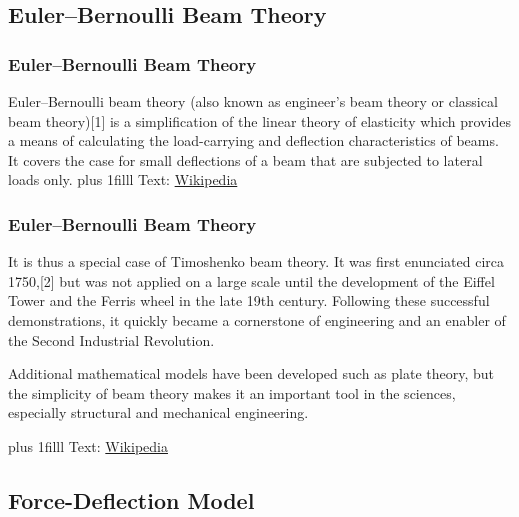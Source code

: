 \documentclass[fleqn]{beamer} %
\newcommand{\sectionIsubsectionItitle}{Euler–Bernoulli Beam Theory}
\newcommand{\sectionIsubsectionIItitle}{Force-Deflection Model}
\newcommand{\btVFill}{\vskip0pt plus 1filll}
\begin{document}
		\subsection{\sectionIsubsectionItitle}\label{sectionIsubsectionI}

			\begin{frame}
				\frametitle{\sectionIsubsectionItitle}
				\bigskip

				Euler–Bernoulli beam theory (also known as engineer's beam theory or classical beam theory)[1] is a simplification of the linear theory of elasticity which provides a means of calculating the load-carrying and deflection characteristics of beams. It covers the case for small deflections of a beam that are subjected to lateral loads only. 
				\btVFill
				{\tiny Text: \href{https://en.wikipedia.org/wiki/Euler\%E2\%80\%93Bernoulli_beam_theory}{Wikipedia}}

			\end{frame}

			\begin{frame}
				\frametitle{\sectionIsubsectionItitle}
				\bigskip

				It is thus a special case of Timoshenko beam theory. It was first enunciated circa 1750,[2] but was not applied on a large scale until the development of the Eiffel Tower and the Ferris wheel in the late 19th century. Following these successful demonstrations, it quickly became a cornerstone of engineering and an enabler of the Second Industrial Revolution.\vspc

				Additional mathematical models have been developed such as plate theory, but the simplicity of beam theory makes it an important tool in the sciences, especially structural and mechanical engineering. 

				\btVFill
				{\tiny Text: \href{https://en.wikipedia.org/wiki/Euler\%E2\%80\%93Bernoulli_beam_theory}{Wikipedia}}

				
			
			\end{frame}


		\subsection{\sectionIsubsectionIItitle}\label{sectionIsubsectionII}
\end{document}
